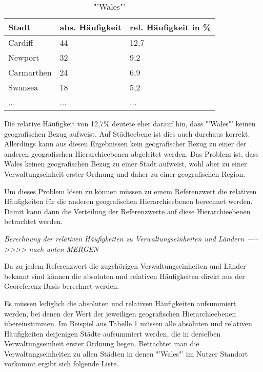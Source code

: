 			\begin{table}[h]
			\centering
			\caption{"'Wales"'}
			\label{tab:walesCity}
			\begin{tabular}{|l|l|l|}
			\hline
			Stadt      & abs. Häufigkeit & rel. Häufigkeit in \% \\ \hline \hline
			Cardiff    & 44 			 & 12,7 \\ \hline
			Newport    & 32 			 & 9,2  \\ \hline
			Carmarthen & 24 			 & 6,9  \\ \hline
			Swansea    & 18 			 & 5,2  \\ \hline
			...    & ... & ...  \\ \hline
			\end{tabular}
			\end{table}

			Die relative Häufigkeit von 12,7\% deutete eher darauf hin, dass "'Wales"' keinen geografischen Bezug aufweist.
			Auf Städteebene ist dies auch durchaus korrekt. 
			Allerdings kann aus diesen Ergebnissen kein geografischer Bezug zu einer der anderen geografischen Hierarchieebenen abgeleitet werden.
			Das Problem ist, dass Wales keinen geografischen Bezug zu einer Stadt aufweist, wohl aber zu einer Verwaltungseinheit erster Ordnung und daher zu einer geografischen Region. 

			Um dieses Problem lösen zu können müssen zu einem Referenzwert die relativen Häufigkeiten für die anderen geografischen Hierarchieebenen berechnet werden.
			Damit kann dann die Verteilung der Referenzwerte auf diese Hierarchieebenen betrachtet werden.
			
		\textit{Berechnung der relativen Häufigkeiten zu Verwaltungseinheiten und Ländern ----->>>> nach unten MERGEN } 

			Da zu jedem Referenzwert die zugehörigen Verwaltungseinheiten und Länder bekannt sind können die absoluten und relativen Häufigkeiten direkt aus der Georeferenz-Basis berechnet werden.

			Es müssen lediglich die absoluten und relativen Häufigkeiten aufsummiert werden, bei denen der Wert der jeweiligen geografischen Hierarchieebenen übereinstimmen.
			Im Beispiel aus Tabelle \ref{tab:walesCity} müssen alle absoluten und relativen Häufigkeiten derjenigen Städte aufsummiert werden, die in derselben Verwaltungseinheit erster Ordnung liegen.
			Betrachtet man die Verwaltungseinheiten zu allen Städten in denen "'Wales"' im Nutzer Standort vorkommt ergibt sich folgende Liste.

